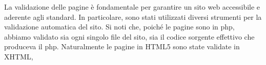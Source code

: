 La validazione delle pagine è fondamentale per garantire un sito web accessibile e aderente agli standard. In particolare, sono stati utilizzati diversi strumenti per la validazione automatica del sito. Si noti che, poiché le pagine sono in php, abbiamo validato sia ogni singolo file del sito, sia il codice sorgente effettivo che produceva il php. Naturalmente le pagine in HTML5 sono state validate in XHTML,